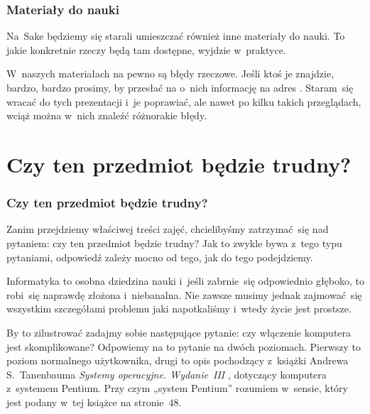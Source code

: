 \documentclass[10pt,t]{beamer}
\begin{document}
\begin{frame}
  \frametitle{Materiały do nauki}


  Na~Sake będziemy się starali umieszczać również inne materiały do nauki.
  To jakie konkretnie rzeczy będą tam dostępne, wyjdzie w~praktyce.


  W~naszych materiałach na pewno są błędy rzeczowe. Jeśli ktoś je znajdzie,
  \alert{bardzo, bardzo prosimy}, by przesłać na o~nich informację na adres
  \email. Staram~się wracać do tych prezentacji i~je poprawiać, ale nawet
  po kilku takich przeglądach, wciąż można w~nich znaleźć różnorakie błędy.

\end{frame}










\section{Czy ten przedmiot będzie trudny?}



\begin{frame}
  \frametitle{Czy ten przedmiot będzie trudny?}


  Zanim przejdziemy właściwej treści zajęć, chcielibyśmy zatrzymać~się
  nad pytaniem: czy ten przedmiot będzie trudny? Jak to zwykle bywa z~tego
  typu pytaniami, odpowiedź zależy mocno od tego, jak do tego podejdziemy.

  Informatyka to osobna dziedzina nauki i~jeśli zabrnie~się odpowiednio
  głęboko, to robi~się naprawdę złożona i~niebanalna. Nie zawsze musimy
  jednak zajmować~się wszystkim szczegółami problemu jaki napotkaliśmy
  i~wtedy życie jest prostsze.

  By to zilustrować zadajmy sobie następujące pytanie: czy włączenie
  komputera jest skomplikowane? Odpowiemy na to pytanie na dwóch poziomach.
  Pierwszy to poziom normalnego użytkownika, drugi to opis pochodzący
  z~książki Andrewa S.~Tanenbauma \textit{Systemy operacyjne. Wydanie~III}
  \parencite{Tanenbaum-Systemy-operacyjne-Wydanie-III-Pub-2013}, dotyczący
  komputera z~systemem Pentium. Przy czym „system Pentium” rozumiem
  w~sensie, który jest podany w~tej książce na stronie~$48$.

\end{frame}
\end{document}
